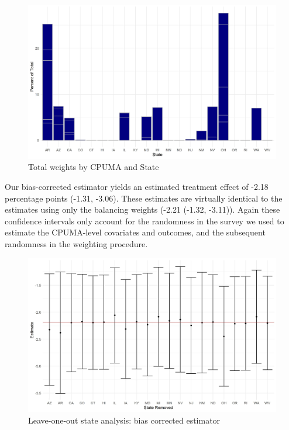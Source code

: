 \documentclass[12pt]{article}
\begin{document}
\begin{figure}[B]
\begin{center}
    \includegraphics[scale=0.6]{images/cpuma-state-wgt-plot-new.jpeg}
    \caption{Total weights by CPUMA and State}
    \label{statewghts}
\end{center}
\end{figure}

Our bias-corrected estimator yields an estimated treatment effect of -2.18 percentage points (-1.31, -3.06). These estimates are virtually identical to the estimates using only the balancing weights (-2.21 (-1.32, -3.11)). Again these confidence intervals only account for the randomness in the survey we used to estimate the CPUMA-level covariates and outcomes, and the subsequent randomness in the weighting procedure. 

\begin{figure}[B]
\begin{center}
    \includegraphics[scale=0.6]{images/loo-states-dr.jpeg}
    \caption{Leave-one-out state analysis: bias corrected estimator}
    \label{loostatesdr}
\end{center}
\end{figure}
\end{document}
